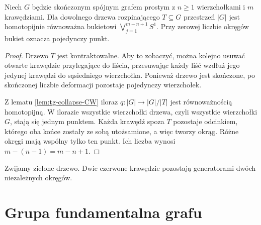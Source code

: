 \begin{twierdzenie}
\label{thm:tg-wedge}
Niech $G$ będzie skończonym spójnym grafem prostym
z $n\ge1$ wierzchołkami i $m$ krawędziami.
Dla dowolnego drzewa rozpinającego $T\subseteq G$
przestrzeń $|G|$ jest homotopijnie równoważna bukietowi
$\bigvee_{j=1}^{m-n+1}S^1$.
Przy zerowej liczbie okręgów bukiet oznacza pojedynczy punkt.
\end{twierdzenie}

\begin{proof}
Drzewo $T$ jest kontraktowalne. Aby to zobaczyć,
można kolejno usuwać otwarte krawędzie przylegające
do liścia, przesuwając każdy liść wzdłuż jego jedynej
krawędzi do sąsiedniego wierzchołka. Ponieważ drzewo
jest skończone, po skończonej liczbie deformacji
pozostaje pojedynczy wierzchołek.

Z lematu \ref{lem:tg-collapse-CW} iloraz
$q:|G|\to|G|/|T|$ jest równoważnością homotopijną.
W ilorazie wszystkie wierzchołki drzewa, czyli wszystkie
wierzchołki $G$, stają się jednym punktem.
Każda krawędź spoza $T$ pozostaje odcinkiem, którego
oba końce zostały ze sobą utożsamione, a więc tworzy
okrąg. Różne okręgi mają wspólny tylko ten punkt.
Ich liczba wynosi $m-(n-1)=m-n+1$.
\end{proof}

\begin{center}

{\footnotesize Zwijamy zielone drzewo. Dwie czerwone krawędzie
pozostają generatorami dwóch niezależnych okręgów.}
\end{center}

\section{Grupa fundamentalna grafu}
\label{sec:tg-pi1}

